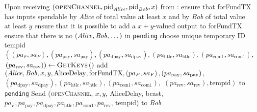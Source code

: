 \begin{algorithmic}[1]
    \State Upon receiving $\left(\textsc{openChannel}, \mathrm{pid}_{\mathit{Alice}},
    \mathrm{pid}_{\mathit{Bob}}, x\right)$ from \environment: 
    \Indent
      \State ensure that forFundTX has inputs spendable by \textit{Alice} of total
      value at least $x$ and by \textit{Bob} of total value at least $y$
      \State ensure that it is possible to add a $x + y$-valued output to
      forFundTX
      \State {}
      \State ensure that there is no $\left(\mathit{Alice}, \mathit{Bob}, \dots\right)$
      in \texttt{pending}
      \State choose unique temporary ID tempid
      \State $\left(\left(pa_F, sa_F\right), \left(pa_{\mathrm{pay}},
      sa_{\mathrm{pay}}\right), \left(pa_{\mathrm{dpay}},
      sa_{\mathrm{dpay}}\right), \left(pa_{\mathrm{htlc}},
      sa_{\mathrm{htlc}}\right), \left(pa_{\mathrm{com}1},
      sa_{\mathrm{com}1}\right),\right.$ $\left.\left(pa_{\mathrm{rev}},
      sa_{\mathrm{rev}}\right)\right) \gets \textsc{GetKeys}\left(\right)$
      \State add $\left(\mathit{Alice}, \mathit{Bob}, x, y, \mathrm{AliceDelay},
      \mathrm{forFundTX}, \left(pa_F, sa_F\right), \left(pa_{\mathrm{pay}},
      sa_{\mathrm{pay}}\right),\right.$ $\left.\left(pa_{\mathrm{dpay}},
      sa_{\mathrm{dpay}}\right), \left(pa_{\mathrm{htlc}},
      sa_{\mathrm{htlc}}\right), \left(pa_{\mathrm{com}1},
      sa_{\mathrm{com}1}\right),\right.$ $\left.\left(pa_{\mathrm{rev}},
      sa_{\mathrm{rev}}\right), \mathrm{tempid}\right)$ to \texttt{pending}
      \State Send (\textsc{openChannel}, $x, y$, AliceDelay, bcast, $pa_F,
      pa_{\mathrm{pay}}, pa_{\mathrm{dpay}}, pa_{\mathrm{htlc}},
      pa_{\mathrm{com}1}, pa_{\mathrm{rev}}$, tempid) to \textit{Bob}
    \EndIndent
    \State


\end{algorithmic}
